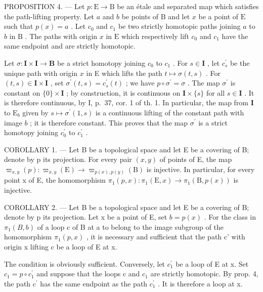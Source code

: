 PROPOSITION 4. --- Let \(p \colon \mathrm{E} \to \mathrm{B}\) be an étale and separated map which satisfies the path-lifting property. Let \(a\) and \(b\) be points of \(\mathrm{B}\) and let \(x\) be a point of \(\mathrm{E}\) such that \(p(x) = a\) . Let \(c_0\) and \(c_1\) be two strictly homotopic paths joining \(a\) to \(b\) in \(\mathrm{B}\) . The paths with origin \(x\) in \(\mathrm{E}\) which respectively lift \(c_0\) and \(c_1\) have the same endpoint and are strictly homotopic.

Let \(\sigma\colon\mathbf{I}\times\mathbf{I}\to\mathbf{B}\) be a strict homotopy joining \(c_{0}\) to \(c_{1}\) . For \(s\in\mathbf{I}\) , let \(c_{s}^{\prime}\) be the unique path with origin \(x\) in E which lifts the path \(t\mapsto\sigma(t,s)\) . For \((t,s)\in\mathbf{I}\times\mathbf{I}\) , set \(\sigma^{\prime}(t,s)=c_{s}^{\prime}(t)\) ; we have \(p\circ\sigma^{\prime}=\sigma\) . The map \(\sigma^{\prime}\) is constant on \(\{0\}\times\mathbf{I}\) ; by construction, it is continuous on \(\mathbf{I}\times\{s\}\) for all \(s\in\mathbf{I}\) . It is therefore continuous, by I, p.~37, cor. 1 of th. 1. In particular, the map from \(\mathbf{I}\) to \(\mathrm{E}_{b}\) given by \(s\mapsto\sigma^{\prime}(1,s)\) is a continuous lifting of the constant path with image \(b\) ; it is therefore constant. This proves that the map \(\sigma^{\prime}\) is a strict homotopy joining \(c_{0}^{\prime}\) to \(c_{1}^{\prime}\) .

COROLLARY 1. --- Let B be a topological space and let E be a covering of B; denote by p its projection. For every pair \((x,y)\) of points of E, the map \(\varpi_{x,y}(p)\colon\varpi_{x,y}(\mathrm{E})\to\varpi_{p(x),p(y)}(\mathrm{B})\) is injective. In particular, for every point x of E, the homomorphism \(\pi_{1}(p,x)\colon\pi_{1}(\mathrm{E},x)\to\pi_{1}(\mathrm{B},p(x))\) is injective.

COROLLARY 2. --- Let B be a topological space and let E be a covering of B; denote by p its projection. Let x be a point of E, set \(b = p(x)\) . For the class in \(\pi_{1}(B, b)\) of a loop c of B at a to belong to the image subgroup of the homomorphism \(\pi_{1}(p, x)\) , it is necessary and sufficient that the path c' with origin x lifting c be a loop of E at x.

The condition is obviously sufficient. Conversely, let \(c_{1}^{\prime}\) be a loop of E at x. Set \(c_{1} = p \circ c_{1}^{\prime}\) and suppose that the loops c and \(c_{1}\) are strictly homotopic. By prop. 4, the path \(c^{\prime}\) has the same endpoint as the path \(c_{1}^{\prime}\) . It is therefore a loop at x.


